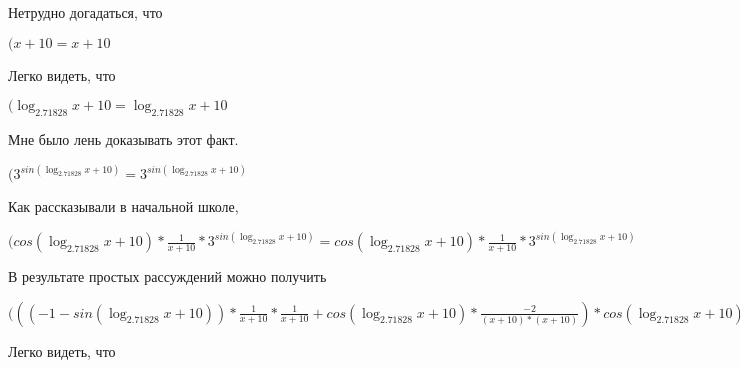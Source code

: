 \documentclass[12pt,a4paper,fleqn]{article}
\theoremstyle{definition}
\begin{document}
Нетрудно догадаться, что

$( x  +  10  =  x  +  10 $

Легко видеть, что

$(\log_{ 2.71828 }{ x  +  10 } = \log_{ 2.71828 }{ x  +  10 }$

Мне было лень доказывать этот факт.

$({ 3 }^{sin(\log_{ 2.71828 }{ x  +  10 })} = { 3 }^{sin(\log_{ 2.71828 }{ x  +  10 })}$

Как рассказывали в начальной школе,

$(cos(\log_{ 2.71828 }{ x  +  10 }) * \frac{ 1 }{ x  +  10 }
 * { 3 }^{sin(\log_{ 2.71828 }{ x  +  10 })} = cos(\log_{ 2.71828 }{ x  +  10 }) * \frac{ 1 }{ x  +  10 }
 * { 3 }^{sin(\log_{ 2.71828 }{ x  +  10 })}$

В результате простых рассуждений можно получить

$((( -1  - sin(\log_{ 2.71828 }{ x  +  10 })) * \frac{ 1 }{ x  +  10 }
 * \frac{ 1 }{ x  +  10 }
 + cos(\log_{ 2.71828 }{ x  +  10 }) * \frac{ -2 }{( x  +  10 ) * ( x  +  10 )}
) * cos(\log_{ 2.71828 }{ x  +  10 }) * \frac{ 1 }{ x  +  10 }
 * { 3 }^{sin(\log_{ 2.71828 }{ x  +  10 })} = (( -1  - sin(\log_{ 2.71828 }{ x  +  10 })) * \frac{ 1 }{ x  +  10 }
 * \frac{ 1 }{ x  +  10 }
 + cos(\log_{ 2.71828 }{ x  +  10 }) * \frac{ -2 }{( x  +  10 ) * ( x  +  10 )}
) * cos(\log_{ 2.71828 }{ x  +  10 }) * \frac{ 1 }{ x  +  10 }
 * { 3 }^{sin(\log_{ 2.71828 }{ x  +  10 })}$

Легко видеть, что
\end{document}
